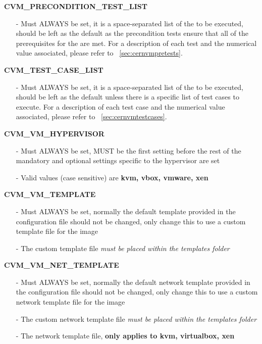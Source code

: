 \begin{description}
\item {\bf CVM\_PRECONDITION\_TEST\_LIST}
		\begin{itemize}
		\item[-]	Must ALWAYS be set, it is a space-separated list of the \pretest to be executed,
						should be left as the default as the precondition tests ensure that all of the 
						prerequisites for the \testcase are met. For a description of each test and the
						numerical value associated, please refer to ~\ref{sec:cernvmpretests}.
		\end{itemize}

\item {\bf CVM\_TEST\_CASE\_LIST}
		\begin{itemize}
		\item[-]	Must ALWAYS be set, it is a space-separated list of the \testcase to be executed,
						should be left as the default unless there is a specific list of test cases to
						execute. For a description of each test case and the numerical value associated,
						please refer to ~\ref{sec:cernvmtestcases}.
		\end{itemize}

\item {\bf CVM\_VM\_HYPERVISOR}
		\begin{itemize}
		\item[-]	Must ALWAYS be set, MUST be the first setting before the rest of the mandatory
	  			and optional settings specific to the hypervisor are set
	  	\item[-]	Valid values (case sensitive) are {\bf kvm, vbox, vmware, xen}
		\end{itemize}

\item {\bf CVM\_VM\_TEMPLATE}
		\begin{itemize}
		\item[-]	Must ALWAYS be set, normally the default template provided in the configuration file
				should not be changed, only change this to use a custom template file for the \cernvm 
				image
		\item[-]	The custom template file \emph{must be placed within the templates folder}
		\end{itemize}

\item {\bf CVM\_VM\_NET\_TEMPLATE}
		\begin{itemize}
		\item[-]	Must ALWAYS be set, normally the default network template provided in the configuration file
				should not be changed, only change this to use a custom network template file for the \cernvm 
				image
		\item[-]	The custom network template file \emph{must be placed within the templates folder}
		\item[-] 	The network template file, {\bf only applies to kvm, virtualbox, xen}
		\end{itemize}


\end{description}
